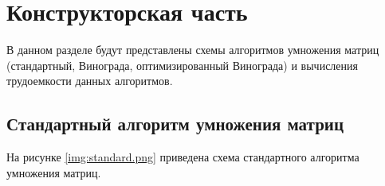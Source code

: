 \chapter{Конструкторская часть}
В данном разделе будут представлены схемы алгоритмов умножения матриц (стандартный, Винограда, оптимизированный Винограда) и вычисления трудоемкости данных алгоритмов.
 

\section{Стандартный алгоритм умножения матриц}

На рисунке \ref{img:standard.png} приведена схема стандартного алгоритма умножения матриц.
\\
\\
\\
\\
\\
\\
\\
\\
\\
\\
\\
\\
\\
\\
\\
\\
\\
\\
\\
\\
\\
\\



\FloatBarrier
